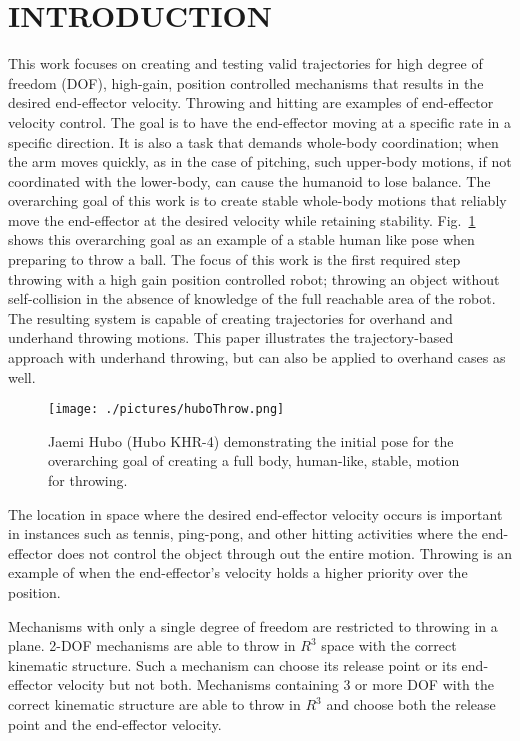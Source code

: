 \section{INTRODUCTION}\label{sec:intro}

This work focuses on creating and testing valid trajectories for high degree of freedom (DOF), high-gain, position controlled mechanisms that results in the desired end-effector velocity.  Throwing and hitting are examples of end-effector velocity control.  The goal is to have the end-effector moving at a specific rate in a specific direction.  It is also a task that demands whole-body coordination; when the arm moves quickly, as in the case of pitching, such upper-body motions, if not coordinated with the lower-body, can cause the humanoid to lose balance.  The overarching goal of this work is to create stable whole-body motions that reliably move the end-effector at the desired velocity while retaining stability.  Fig.~\ref{fig:huboOneFoot} shows this overarching goal as an example of a stable human like pose when preparing to throw a ball.  The focus of this work is the first required step throwing with a high gain position controlled robot; throwing an object without self-collision in the absence of knowledge of the full reachable area of the robot.  The resulting system is capable of creating trajectories for overhand and underhand throwing motions.  This paper illustrates the trajectory-based approach with underhand throwing, but can also be applied to overhand cases as well.

\begin{figure}[thpb!]
  \centering
\texttt{[image: ./pictures/huboThrow.png]}
  \caption{Jaemi Hubo (Hubo KHR-4) demonstrating the initial pose for the overarching goal of creating a full body, human-like, stable, motion for throwing.}
  \label{fig:huboOneFoot}
\end{figure}

The location in space where the desired end-effector velocity occurs is important in instances such as tennis, ping-pong, and other hitting activities where the end-effector does not control the object through out the entire motion.  Throwing is an example of when the end-effector's velocity holds a higher priority over the position.  


Mechanisms with only a single degree of freedom are restricted to throwing in a plane.   2-DOF mechanisms are able to throw in $R^3$ space with the correct kinematic structure.  Such a mechanism can choose its release point or its end-effector velocity but not both.  Mechanisms containing 3 or more DOF with the correct kinematic structure are able to throw in $R^3$ and choose both the release point and the end-effector velocity.  

